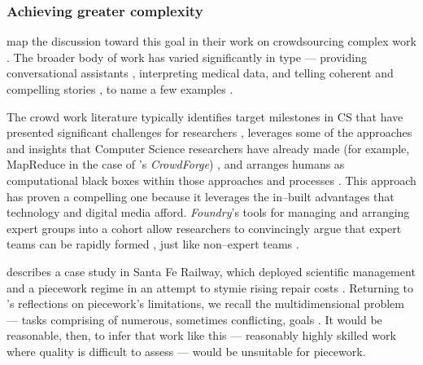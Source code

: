 \documentclass[trackingWork]{subfiles}
\begin{document}
\subsubsection[finding crowd work's limits]{Achieving greater complexity}\label{sec:complexity}
\subsubsubsection{\crowdworkpers}
\citeauthor{crowdForgeKittur}
map the discussion toward this goal in their work on
crowdsourcing complex work
\cite{crowdForgeKittur}.
The broader body of work has varied significantly in type
--- providing conversational assistants%
, interpreting medical data, and
telling coherent and compelling stories%
, to name a few examples
\cite{Lasecki:2013:CCC:2501988.2502057,mavandadi2012distributed,KimStoria}.

The crowd work literature typically identifies target milestones in CS
that have presented significant challenges for researchers%
, leverages some of the approaches and insights that Computer Science researchers have already made
(for example, MapReduce in the case of \citeauthor{crowdForgeKittur}'s \textit{CrowdForge})%
, and arranges humans as computational black boxes within those approaches and processes
\cite[][and others]{crowdForgeKittur,foundry}.
This approach has proven a compelling one because
it leverages the in--built advantages that technology and digital media afford.
\textit{Foundry}'s tools for managing and arranging expert groups into a cohort
allow researchers to convincingly argue that expert teams can be rapidly formed%
, just like non--expert teams
\cite{foundry}.



\subsubsubsection{\pieceworkpers}
\citeauthor{10.2307/23702539} describes a case study in Santa Fe Railway, which
deployed scientific management and a piecework regime in an attempt to stymie rising repair costs
\cite{10.2307/23702539}.
Returning to \citeauthor{hart2016rise}'s reflections on piecework's limitations,
we recall the multidimensional problem
--- tasks comprising of numerous, sometimes conflicting, goals
\cite{hart2016rise}.
It would be reasonable, then, to infer that work like this
--- reasonably highly skilled work where quality is difficult to assess ---
would be unsuitable for piecework.
\end{document}

